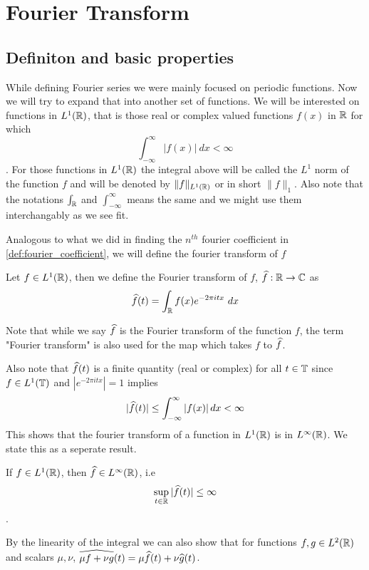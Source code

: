\chapter{Fourier Transform}

\section{Definiton and basic properties}
  While defining Fourier series we were mainly focused on periodic functions. Now we will try to expand that into another set of functions. We will be interested on functions in $L^1(\mathbb R)$, that is those real or complex valued functions $f(x)$ in $\mathbb R$ for which $$\int_{-\infty}^{\infty} |f(x)| \ dx < \infty$$. For those functions in $L^1(\mathbb R)$ the integral above will be called the $L^1$ norm of the function $f$ and will be denoted by $\|f\|_{L^1(\mathbb R)}$ or in short $\|f\|_1$. Also note that the notations $\int_{\mathbb R}$ and $\int_{-\infty}^{\infty}$ means the same and we might use them interchangably as we see fit.

  Analogous to what we did in finding the $n^{th}$ fourier coefficient in \autoref{def:fourier_coefficient}, we will define the fourier transform of $f$

  \begin{definition}
    \label{def:fourier_transform_of_f}
    Let $f \in L^1(\mathbb R)$, then we define the Fourier transform of $f$, $\widehat{f} : \mathbb R \to \mathbb C$ as $$\hatf(t) = \int_{\R} f(x) e^{-2 \pi itx} \ dx$$
  \end{definition}
  Note that while we say $\widehat{f}$ is the Fourier transform of the function $f$, the term "Fourier transform" is also used for the map which takes $f$ to $\widehat{f}$.

  Also note that $\widehat{f}(t)$ is a finite quantity (real or complex) for all $t \in \mathbb T$ since $f\in L^1(\mathbb T)$ and $|e^{-2 \pi itx}| = 1$ implies $$|\widehat{f}(t)| \le \int_{-\infty}^{\infty}\left|f(x)\right| dx < \infty$$
  This shows that the fourier transform of a function in $L^1(\mathbb R)$ is in $L^\infty(\mathbb R)$. We state this as a seperate result.
  \begin{proposition}
    \label{prop:fourier_transform_of_L1_functions_in_R_are_bounded}
    If $f \in L^1(\mathbb R)$, then $\widehat{f} \in L^\infty(\mathbb R)$, i.e $$\sup_{t \in \mathbb R} |\widehat{f}(t)| \le \infty$$.
  \end{proposition}

  By the linearity of the integral we can also show that for functions $f, g \in L^2(\mathbb R)$ and scalars $\mu, \nu$, $\widehat{\mu f + \nu g}(t) = \mu \widehat{f}(t) + \nu\widehat{g}(t)$.
 
